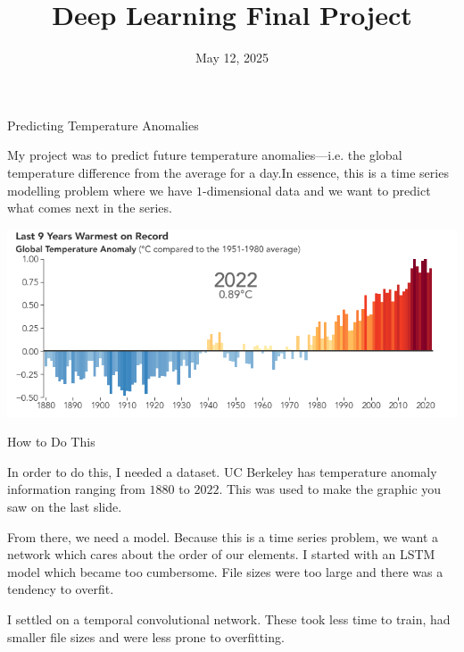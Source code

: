 \documentclass{beamer}
\title[Deep Learning Final Project]{\bf\huge
\textcolor{reedcolor}{Deep Learning Final Project}}
\date{\textcolor{reedcolor}{May 12, 2025}}
\newcommand{\bigspace}{\vspace{10pt}\pause}
\begin{document}
\begin{frame}
  \maketitle
\end{frame}

\begin{frame}{Predicting Temperature Anomalies}

  My project was to predict future temperature anomalies---i.e. the global
  temperature difference from the average for a day.\pause In essence, this is
  a time series modelling problem where we have $1$-dimensional data and we
  want to predict what comes next in the series.

  \begin{center}
    \includegraphics[scale=0.4]{global_gis_2022_chart.png}
  \end{center}

\end{frame}

\begin{frame}{How to Do This}

  In order to do this, I needed a dataset. UC Berkeley has temperature anomaly
  information ranging from $1880$ to $2022$. This was used to make the graphic
  you saw on the last slide.

  \bigspace

  From there, we need a model. Because this is a time series problem, we want a
  network which cares about the order of our elements. \pause I started with an
  LSTM model which became too cumbersome. File sizes were too large and there
  was a tendency to overfit.

  \bigspace

  I settled on a temporal convolutional network. These took less time to train,
  had smaller file sizes and were less prone to overfitting.

\end{frame}
\end{document}
